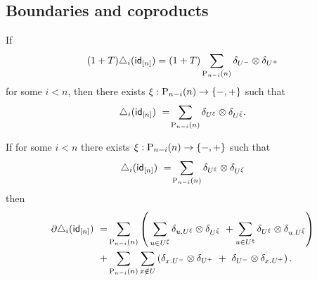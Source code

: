 \subsection{Boundaries and coproducts}



\begin{lemma} \label{lemma: (1+T) triangle = (1+T) sum implies triangle = sum}
    If
    \[
    (1 + T) \triangle_i (\id_{[n]}) =
    (1 + T) \sum_{\P_{n-i}(n)} \delta_{U^-} \otimes \delta_{U^+}
    \]
    for some $i < n$, then there exists $\xi : \P_{n-i}(n) \to \{-, +\}$  such that
    \[
    \triangle_i (\id_{[n]})\ =\! \sum_{\P_{n-i}(n)} \delta_{U^{\xi}} \otimes \delta_{U^{\bar{\xi}}}.
    \]
\end{lemma}


\begin{lemma} \label{lemma: boundary of triangle}
	If for some $i < n$ there exists $\xi : \P_{n-i}(n) \to \{-, +\}$ such that
	\[
	\triangle_i(\id_{[n]})\ =\! \sum_{\P_{n-i}(n)} \delta_{U^{\xi}} \otimes \delta_{U^{{\bar{\xi}}}}
	\]
	then
	\begin{align}
	\label{equation: boundary of triangle}
	\partial \triangle_i(\id_{[n]})\ = &
	\sum_{\P_{n-i}(n)} \left( \, \sum_{u \in U^{\bar{\xi}}} \delta_{u.U^\xi} \tensor \delta_{U^{\bar{\xi}}} \ +
	\sum_{u \in U^\xi} \delta_{U^\xi} \tensor \delta_{u.U^{\bar{\xi}}} \right) \\ + &
	\sum_{\P_{n-i}(n)} \sum_{x \notin U} \left( \delta_{x.U^-} \tensor \delta_{U^+}\ +\ \delta_{U^-} \tensor \delta_{x.U^+} \right).
	\end{align}
\end{lemma}

